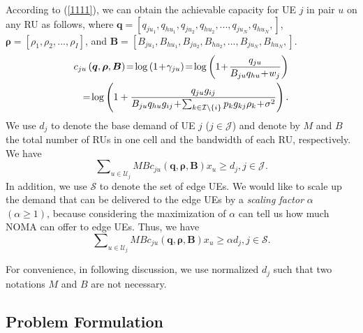 \documentclass[10pt,journal,final,finalsubmission,twocolumn]{IEEEtran}
\begin{document}
According to (\ref{1111}), we can obtain the achievable capacity for UE $j$ in pair $u$ on any RU as follows, where $\boldsymbol{q}=[q_{ju_1},q_{hu_1},q_{ju_2},q_{hu_2},...,q_{ju_N},q_{hu_N},]$, $\boldsymbol{\rho}=[\rho_1,\rho_2,..., \rho_I]$, and $\boldsymbol{B}=[B_{ju_1},B_{hu_1},B_{ju_2},B_{hu_2},...,B_{ju_N},B_{hu_N},]$.
\begin{align}
c_{ju}\left (\boldsymbol{q},\boldsymbol{ \rho}, \boldsymbol{B}\right )\!=\!\log \left ( 1\!+\!\gamma_{ju} \right )\!=\!\log \left ( 1\!+\!\frac{q_{ju}}{B_{ju}q_{hu}\!+\!w_j} \right )\notag\\
=\!\log \left ( 1+\frac{q_{ju}g_{ij}}{{B_{ju}q_{hu}g_{ij}}\!+\!{\sum_{k\in \mathcal{I}\setminus \left \{ i \right \}}p_kg_{kj}\rho_k}\!+\!\sigma ^2} \right ).
\end{align}
We use $d_j$ to denote the base demand of UE $j$ ($j \in \mathcal{J}$) and denote by $M$ and $B$ the total number of RUs in one cell and the bandwidth of each RU, respectively. We have
\begin{equation}
\sum\nolimits_{u\in {\mathcal{U}}_j} M B c_{ju}\left (\boldsymbol{q},\boldsymbol{ \rho}, \boldsymbol{B}\right )x_u\geq d_j, j \in \mathcal{J}.
\end{equation}
In addition, we use $\mathcal{S}$ to denote the set of edge UEs. We would like to scale up the demand that can be delivered to the edge UEs by a {\em scaling factor} $\alpha$ $\left (\alpha \geq 1\right)$, because considering the maximization of $\alpha$ can tell us how much NOMA can offer to edge UEs. Thus, we have
\begin{equation}
\sum\nolimits_{u\in {\mathcal{U}}_j} M B c_{ju}\left (\boldsymbol{q},\boldsymbol{ \rho}, \boldsymbol{B}\right )x_u\geq \alpha d_j,j\in \mathcal{S}.
\end{equation}

For convenience, in following discussion, we use normalized $d_j$ such that two notations $M$ and $B$ are not necessary.

\subsection{Problem Formulation}\label{MathematicalFormulation}
\end{document}

